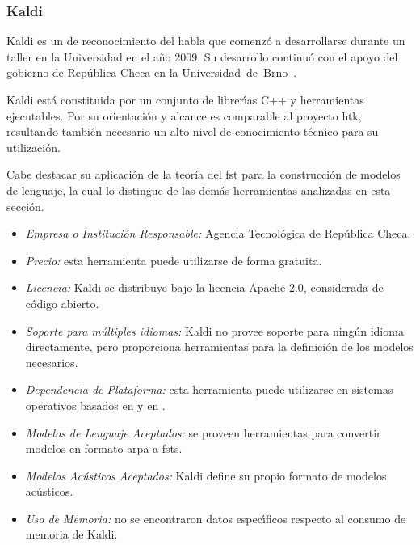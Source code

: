 \subsubsection{Kaldi}
\label{sec:kaldi}

Kaldi es un  de reconocimiento del habla que comenz\'o a desarrollarse durante un taller
en la Universidad  en el a\~no 2009. Su desarrollo continu\'o con el apoyo del gobierno
de Rep\'ublica Checa en la \mbox{Universidad de Brno \cite{Povey_ASRU2011}}.

Kaldi est\'a constituida por un conjunto de librer{\'\i}as C++ y herramientas ejecutables. Por su orientaci\'on y
alcance es comparable al proyecto \gls{htk}, resultando tambi\'en necesario un alto nivel de conocimiento t\'ecnico
para su utilizaci\'on.

Cabe destacar su aplicación de la teoría del \gls{fst} para la
construcci\'on de modelos de lenguaje, la cual lo distingue de las dem\'as herramientas analizadas en esta secci\'on.

\begin{itemize}
	\item \emph{Empresa o Instituci\'on Responsable:} Agencia Tecnol\'ogica de Rep\'ublica Checa.
	\item \emph{Precio:} esta herramienta puede utilizarse de forma gratuita.
	\item \emph{Licencia:} Kaldi se distribuye bajo la licencia Apache 2.0, considerada de c\'odigo 
	abierto.
	\item \emph{Soporte para m\'ultiples idiomas:} Kaldi no provee soporte para ning\'un
	idioma directamente, pero proporciona herramientas para la definici\'on de los modelos 
	\mbox{necesarios.}
	\item \emph{Dependencia de Plataforma:} esta herramienta puede utilizarse en sistemas operativos
	basados en  y en .
	\item \emph{Modelos de Lenguaje Aceptados:} se proveen herramientas para convertir modelos en formato
	\gls{arpa} a \gls{fst}s.
	\item \emph{Modelos Ac\'usticos Aceptados:} Kaldi define su propio formato de modelos ac\'usticos.
	\item \emph{Uso de Memoria:} no se encontraron datos espec{\'\i}ficos respecto al consumo de memoria
	de Kaldi.
\end{itemize}